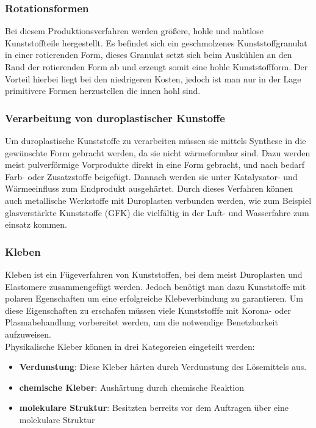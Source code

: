 \subsubsection{Rotationsformen}
Bei diesem Produktionsverfahren werden größere, hohle und nahtlose Kunststoffteile hergestellt. Es befindet sich
ein geschmolzenes Kunststoffgranulat in einer rotierenden Form, dieses Granulat setzt sich beim Auskühlen an den
Rand der rotierenden Form ab und erzeugt somit eine hohle Kunststoffform.
Der Vorteil hierbei liegt bei den niedrigeren Kosten, jedoch ist man nur in der Lage primitivere Formen herzustellen
die innen hohl sind.

\subsubsection{Verarbeitung von duroplastischer Kunstoffe}
Um duroplastische Kunststoffe zu verarbeiten müssen sie mittels Synthese in die gewünschte Form gebracht werden, da sie
nicht wärmeformbar sind. Dazu werden meist pulverförmige Vorprodukte direkt in eine Form gebracht, und nach bedarf
Farb- oder Zusatzstoffe beigefügt. Dannach werden sie unter Katalysator- und Wärmeeinfluss zum Endprodukt ausgehärtet.
Durch dieses Verfahren können auch metallische Werkstoffe mit Duroplasten verbunden werden, wie zum Beispiel
glasverstärkte Kunststoffe (GFK) die vielfältig in der Luft- und Wasserfahre zum einsatz kommen.

\subsubsection{Kleben}
Kleben ist ein Fügeverfahren von Kunststoffen, bei dem meist Duroplasten und Elastomere zusammengefügt werden.
Jedoch benötigt man dazu Kunststoffe mit polaren Egenschaften um eine erfolgreiche Klebeverbindung zu garantieren.
Um diese Eigenschaften zu erschafen müssen viele Kunststofffe mit Korona- oder Plasmabehandlung vorbereitet werden,
um die notwendige Benetzbarkeit aufzuweisen.\\
Physikalische Kleber können in drei Kategoreien eingeteilt werden:
\begin{itemize}
    \item \textbf{Verdunstung}: Diese Kleber härten durch Verdunstung des Lösemittels aus.
    \item \textbf{chemische Kleber}: Aushärtung durch chemische Reaktion
    \item \textbf{molekulare Struktur}: Besitzten berreits vor dem Auftragen über eine molekulare Struktur
\end{itemize}

